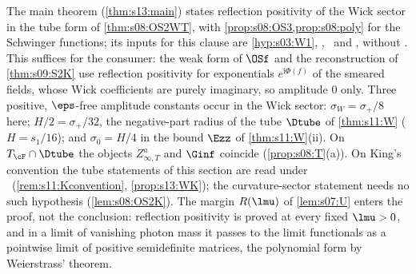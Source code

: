 \begin{remark}\label{rem:s08:amplitudes}
The main theorem (\cref{thm:s13:main}) states reflection positivity of the Wick sector in the tube form of \cref{thm:s08:OS2WT}, with \cref{prop:s08:OS3,prop:s08:poly} for the Schwinger functions; its inputs for this clause are \cref{hyp:s03:W1}, \Itwo, \Ithree\ and \cite[Thm.~6.2(1)--(4)]{BFS1}, without \Wtwo. This suffices for the consumer: the weak form of $\OSf$ and the reconstruction of \cref{thm:s09:S2K} use reflection positivity for exponentials $e^{\mathrm i\Phi(f)}$ of the smeared fields, whose Wick coefficients are purely imaginary, so amplitude $0$ only. Three positive, $\eps$-free amplitude constants occur in the Wick sector: $\sigma_W=\sigma_+/8$ here; $H/2=\sigma_+/32$, the negative-part radius of the tube $\Dtube$ of \cref{thm:s11:W} ($H=s_1/16$); and $\sigma_0=H/4$ in the bound $\Ezz$ of \cref{thm:s11:W}(ii). On $T_\cF\cap\Dtube$ the objects $Z^a_{\infty,T}$ and $\Ginf$ coincide (\cref{prop:s08:T}(a)). On King's convention the tube statements of this section are read under \TWK\ (\cref{rem:s11:Kconvention}, \cref{prop:s13:WK}); the curvature-sector statement needs no such hypothesis (\cref{lem:s08:OS2K}). The margin $R(\lmu)$ of \cref{lem:s07:U} enters the proof, not the conclusion: reflection positivity is proved at every fixed $\lmu>0$, and in a limit of vanishing photon mass it passes to the limit functionals as a pointwise limit of positive semidefinite matrices, the polynomial form by Weierstrass' theorem.
\end{remark}
